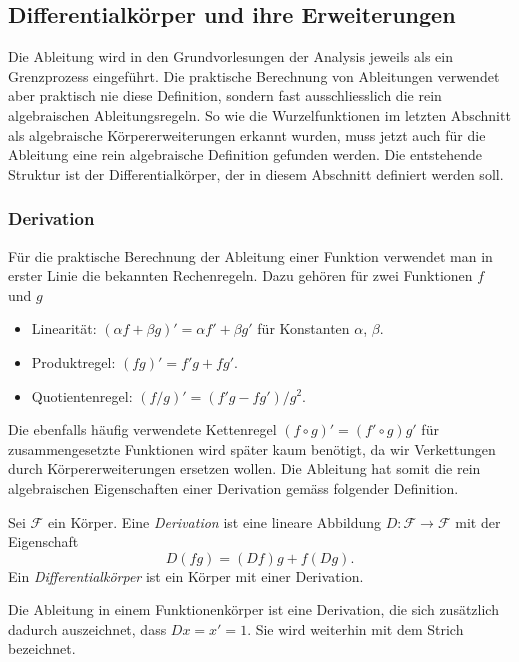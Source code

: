 %
%
%
\subsection{Differentialkörper und ihre Erweiterungen
\label{buch:integral:subsection:diffke}}
Die Ableitung wird in den Grundvorlesungen der Analysis jeweils
als ein Grenzprozess eingeführt.
Die praktische Berechnung von Ableitungen verwendet aber praktisch
nie diese Definition, sondern fast ausschliesslich die rein algebraischen
Ableitungsregeln.
So wie die Wurzelfunktionen im letzten Abschnitt als algebraische
Körpererweiterungen erkannt wurden, muss jetzt auch für die Ableitung
eine rein algebraische Definition gefunden werden.
Die entstehende Struktur ist der Differentialkörper, der in diesem
Abschnitt definiert werden soll.

%
%
\subsubsection{Derivation}
Für die praktische Berechnung der Ableitung einer Funktion verwendet
man in erster Linie die bekannten Rechenregeln.
Dazu gehören für zwei Funktionen $f$ und $g$
\begin{itemize}
\item Linearität: $(\alpha f+\beta g)' = \alpha f' + \beta g'$ für
Konstanten $\alpha$, $\beta$.
\item Produktregel: $(fg)'=f'g+fg'$.
%
\item Quotientenregel: $(f/g)' = (f'g-fg')/g^2$.
%
\end{itemize}
Die ebenfalls häufig verwendete Kettenregel $(f\circ g)' = (f'\circ g) g'$
%
für zusammengesetzte Funktionen wird später kaum benötigt, da wir
Verkettungen durch Körpererweiterungen ersetzen wollen.
Die Ableitung hat somit die rein algebraischen Eigenschaften
einer Derivation gemäss folgender Definition.

\begin{definition}
Sei $\mathscr{F}$ ein Körper.
Eine {\em Derivation} ist eine lineare Abbildung
%
$D\colon \mathscr{F}\to\mathscr{F}$
mit der Eigenschaft
\[
D(fg) = (Df)g+f(Dg).
\]
Ein {\em Differentialkörper} ist ein Körper mit einer Derivation.
%
\end{definition}

Die Ableitung in einem Funktionenkörper ist eine Derivation,
die sich zusätzlich dadurch auszeichnet, dass $Dx=x'=1$.
Sie wird weiterhin mit dem Strich bezeichnet.

